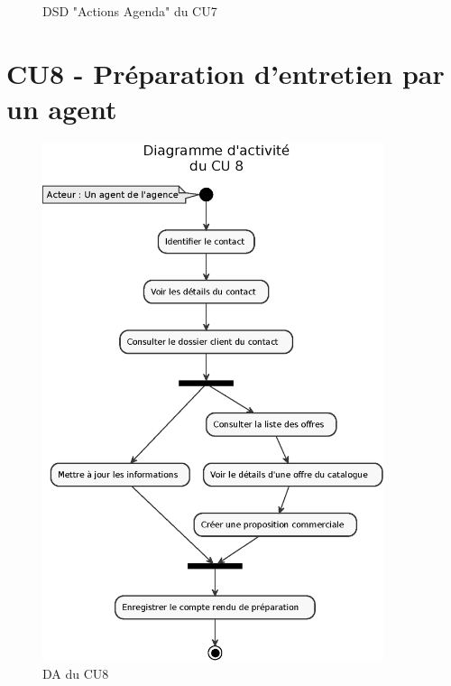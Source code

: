\begin{figure}[H]
\noindent{}
\caption{DSD "Actions Agenda" du CU7}
\end{figure}

\clearpage
\section{CU8 - Préparation d’entretien par un agent}

\begin{figure}[H]
\centering
\includegraphics[width=10cm]{figures/eps/DA_CU8.eps}
\caption{DA du CU8}
\end{figure}

